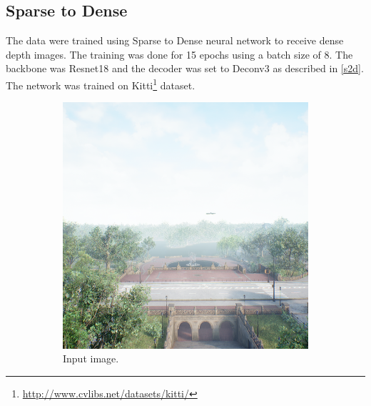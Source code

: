 \documentclass[twoside]{ctuthesis}
\theoremstyle{plain}
\theoremstyle{definition}
\theoremstyle{note}
\begin{document}
\subsection{Sparse to Dense}
The data were trained using Sparse to Dense neural network to receive dense depth images. The training was done for 15 epochs using a batch size of 8. The backbone was Resnet18 and the decoder was set to Deconv3 as described in \autoref{s2d}. The network was trained on Kitti\footnote{\url{http://www.cvlibs.net/datasets/kitti/}} dataset.
\begin{figure}
	\centering
	\begin{subfigure}[b]{0.4\textwidth}
		\centering
		\includegraphics[width=\textwidth]{s2d_input.png}
		\caption{Input image.}
	\end{subfigure}
	\hfill
	\begin{subfigure}[b]{0.4\textwidth}
		\centering

\end{subfigure}
\end{figure}
\end{document}
